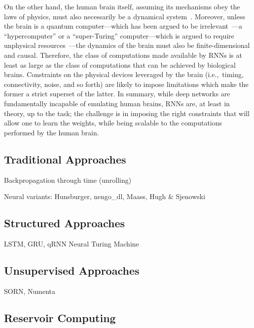 On the other hand, the human brain itself, assuming its mechanisms obey the laws of physics, must also necessarily be a dynamical system~\citep{mckenna1994brain}.
Moreover, unless the brain is a quantum computer---which has been argued to be irrelevant~\citep{litt2006brain}---a ``hypercomputer'' or a ``super-Turing'' computer---which is argued to require unphysical resources~\citep{broersma2018computability}---the dynamics of the brain must also be finite-dimensional and causal.
Therefore, the class of computations made available by RNNs is at least as large as the class of computations that can be achieved by biological brains.
Constraints on the physical devices leveraged by the brain (i.e.,~timing, connectivity, noise, and so forth) are likely to impose limitations which make the former a strict superset of the latter.
In summary, while deep networks are fundamentally incapable of emulating human brains, RNNs are, at least in theory, up to the task; the challenge is in imposing the right constraints that will allow one to learn the weights, while being scalable to the computations performed by the human brain. %

\citep{pascanu2013difficulty}
\citep{salehinejad2017recent}

\subsection{Traditional Approaches}

Backpropagation through time (unrolling)

Neural variants: Hunsburger, nengo\_dl, Maass, Hugh \& Sjenowski

\subsection{Structured Approaches}

LSTM, GRU, qRNN
Neural Turing Machine

\subsection{Unsupervised Approaches}

SORN, Numenta

\subsection{Reservoir Computing}

